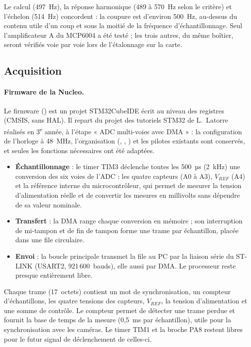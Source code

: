 Le calcul (497~Hz), la réponse harmonique (489 à 570~Hz selon le critère) et l'échelon (514~Hz) concordent : la coupure est d'environ 500~Hz, au-dessus du contenu utile d'un coup et sous la moitié de la fréquence d'échantillonnage. Seul l'amplificateur A du MCP6004 a été testé ; les trois autres, du même boîtier, seront vérifiés voie par voie lors de l'étalonnage sur la carte.

\subsection{Acquisition}

\paragraph{Firmware de la Nucleo.} Le firmware () est un projet STM32CubeIDE écrit au niveau des registres (CMSIS, sans HAL). Il repart du projet des tutoriels STM32 de L.~Latorre réalisés en 3\textsuperscript{e} année, à l'étape « ADC multi-voies avec DMA » : la configuration de l'horloge à 48~MHz, l'organisation (, , ) et les pilotes existants sont conservés, et seules les fonctions nécessaires ont été adaptées.

\begin{itemize}
  \item \textbf{Échantillonnage} : le timer TIM3 déclenche toutes les 500~µs (2~kHz) une conversion des six voies de l'ADC : les quatre capteurs (A0 à A3), $V_{REF}$ (A4) et la référence interne du microcontrôleur, qui permet de mesurer la tension d'alimentation réelle et de convertir les mesures en millivolts sans dépendre de sa valeur nominale.
  \item \textbf{Transfert} : la DMA range chaque conversion en mémoire ; son interruption de mi-tampon et de fin de tampon forme une trame par échantillon, placée dans une file circulaire.
  \item \textbf{Envoi} : la boucle principale transmet la file au PC par la liaison série du ST-LINK (USART2, 921\,600~bauds), elle aussi par DMA. Le processeur reste presque entièrement libre.
\end{itemize}

Chaque trame (17~octets) contient un mot de synchronisation, un compteur d'échantillons, les quatre tensions des capteurs, $V_{REF}$, la tension d'alimentation et une somme de contrôle. Le compteur permet de détecter une trame perdue et fournit la base de temps de la mesure (0,5~ms par échantillon), utile pour la synchronisation avec les caméras. Le timer TIM1 et la broche PA8 restent libres pour le futur signal de déclenchement de celles-ci.

